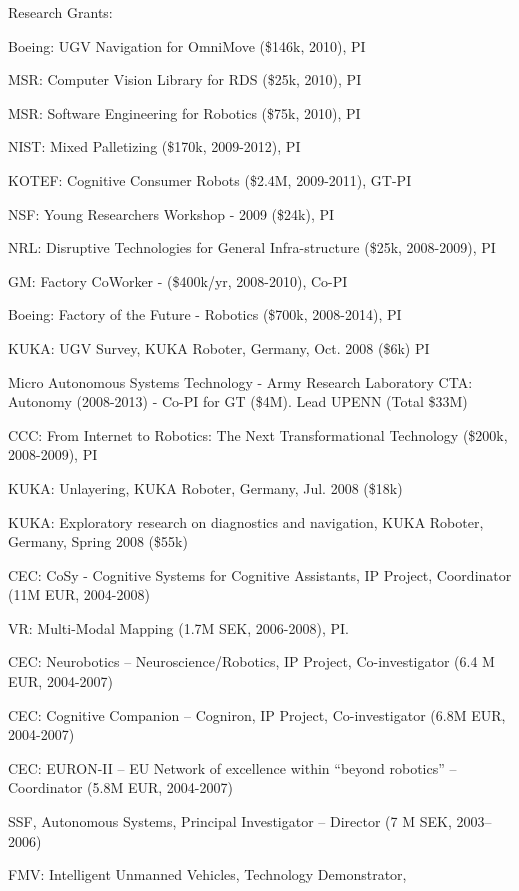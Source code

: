 \documentclass{article}
\begin{document}
\begin{cv}
\begin{cvlist}{Research Grants:}
\item Boeing: UGV Navigation for OmniMove (\$146k, 2010), PI
\item MSR: Computer Vision Library for RDS (\$25k, 2010), PI
\item MSR: Software Engineering for Robotics (\$75k, 2010), PI
\item NIST: Mixed Palletizing (\$170k, 2009-2012), PI
\item KOTEF: Cognitive Consumer Robots (\$2.4M, 2009-2011), GT-PI
\item NSF: Young Researchers Workshop - 2009 (\$24k), PI
\item NRL: Disruptive Technologies for General Infra-structure  (\$25k, 2008-2009), PI
\item GM: Factory CoWorker - (\$400k/yr, 2008-2010), Co-PI
\item Boeing: Factory of the Future - Robotics (\$700k, 2008-2014), PI
\item KUKA: UGV Survey, KUKA Roboter, Germany, Oct. 2008 (\$6k)  PI%
\item Micro Autonomous Systems Technology - Army Research Laboratory
  CTA: Autonomy (2008-2013) - Co-PI for GT (\$4M). Lead UPENN (Total \$33M) %
\item CCC: From Internet to Robotics: The Next Transformational
  Technology (\$200k, 2008-2009), PI %
\item KUKA: Unlayering, KUKA Roboter, Germany, Jul. 2008 (\$18k) %
\item KUKA: Exploratory research on diagnostics and navigation, KUKA
  Roboter, Germany, Spring 2008 (\$55k)%
\item CEC: CoSy - Cognitive Systems for Cognitive Assistants, IP
  Project, Coordinator (11M EUR, 2004-2008)
\item VR: Multi-Modal Mapping (1.7M SEK, 2006-2008), PI.%
\item CEC: Neurobotics -- Neuroscience/Robotics, IP Project,
  Co-investigator (6.4 M EUR, 2004-2007)%
\item CEC: Cognitive Companion -- Cogniron, IP Project,
  Co-investigator (6.8M EUR, 2004-2007) %
\item CEC: EURON-II -- EU Network of excellence within ``beyond
  robotics''  -- Coordinator (5.8M EUR, 2004-2007) %
\item SSF, Autonomous Systems, Principal Investigator -- Director  (7
  M SEK, 2003--2006) %
\item FMV: Intelligent Unmanned Vehicles, Technology Demonstrator,

\end{cvlist}
\end{cv}
\end{document}
